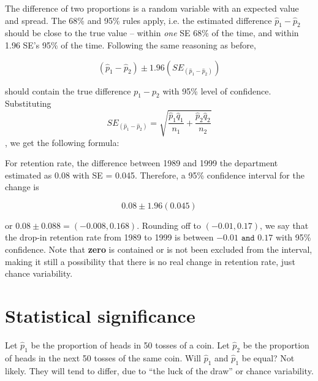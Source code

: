 \documentclass[11pt, chapterprefix=true]{scrbook}\usepackage[]{graphicx}\usepackage[]{color}
\begin{document}
The difference of two proportions is a random variable with an expected value and spread.  The 68\% and 95\% rules apply, i.e.  the estimated difference $\hat{p}_1 - \hat{p}_2$ should be close to the true value -- within \textit{one} SE 68\% of the time, and within 1.96 SE's 95\% of the time.  Following the same reasoning as before,

\begin{equation*}
  (\hat{p}_1 - \hat{p}_2) \pm 1.96 (SE_{(\hat{p}_1 - \hat{p}_2)})
\end{equation*}

should contain the true difference $p_1 - p_2$ with 95\% level of confidence.  Substituting
$$ SE_{( \hat{p}_1 - \hat{p}_2)} = \sqrt{ \frac{ \hat{p}_1 \hat{q}_1}{n_1} + \frac{ \hat{p}_2 \hat{q}_2}{n_2}} $$,
we get the following formula:

\begin{center}
\end{center}

For retention rate, the difference between 1989 and 1999 the department estimated as 0.08 with SE = 0.045.  Therefore, a 95\% confidence interval for the change is

\begin{equation*}
0.08 \pm 1.96 (0.045)
\end{equation*}

or $0.08 \pm 0.088 = (-0.008, 0.168)$.  Rounding off to $(-0.01, 0.17)$, we say that the drop-in retention rate from 1989 to 1999 is between $-0.01 \texttt{ and } 0.17$ with 95\% confidence. Note that \textbf{zero} is contained or is not been excluded from the interval, making it still a possibility that there is no real change in retention rate, just chance variability.

\section{Statistical significance}

Let $\hat{p}_1$ be the proportion of heads in 50 tosses of a coin.  Let $\hat{p}_2$  be the proportion of heads in the next 50 tosses of the same coin.  Will $\hat{p}_1$  and $\hat{p}_1$ be equal?  Not likely.  They will tend to differ, due to ``the luck of the draw'' or chance variability.
\end{document}
